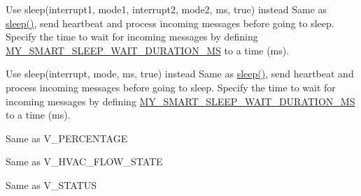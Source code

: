 \begin{DoxyRefList}
\item[Member \mbox{\hyperlink{group___my_sensors_coregrp_ga4cdf6cad964561b3ab0d6058d1a4d0b5}{smart\+Sleep}} (const uint8\+\_\+t interrupt1, const uint8\+\_\+t mode1, const uint8\+\_\+t interrupt2, const uint8\+\_\+t mode2, const uint32\+\_\+t sleeping\+MS=0)]\label{deprecated__deprecated000022}%
%
Use sleep(interrupt1, mode1, interrupt2, mode2, ms, true) instead Same as \mbox{\hyperlink{group___my_sensors_coregrp_gab5f84c4227e3478af4b6600d5e8d8b15}{sleep()}}, send heartbeat and process incoming messages before going to sleep. Specify the time to wait for incoming messages by defining \mbox{\hyperlink{group___sleep_setting_grp_pub_gaf353bf3627ebd8f15e200b320e2e065d}{M\+Y\+\_\+\+S\+M\+A\+R\+T\+\_\+\+S\+L\+E\+E\+P\+\_\+\+W\+A\+I\+T\+\_\+\+D\+U\+R\+A\+T\+I\+O\+N\+\_\+\+MS}} to a time (ms).  
\item[Member \mbox{\hyperlink{group___my_sensors_coregrp_gad9e11c9a491940337f7354f553391f2f}{smart\+Sleep}} (const uint8\+\_\+t interrupt, const uint8\+\_\+t mode, const uint32\+\_\+t sleeping\+MS=0)]\label{deprecated__deprecated000021}%
%
Use sleep(interrupt, mode, ms, true) instead Same as \mbox{\hyperlink{group___my_sensors_coregrp_gab5f84c4227e3478af4b6600d5e8d8b15}{sleep()}}, send heartbeat and process incoming messages before going to sleep. Specify the time to wait for incoming messages by defining \mbox{\hyperlink{group___sleep_setting_grp_pub_gaf353bf3627ebd8f15e200b320e2e065d}{M\+Y\+\_\+\+S\+M\+A\+R\+T\+\_\+\+S\+L\+E\+E\+P\+\_\+\+W\+A\+I\+T\+\_\+\+D\+U\+R\+A\+T\+I\+O\+N\+\_\+\+MS}} to a time (ms).  
\item[Member \mbox{\hyperlink{group___my_messagegrp_gga8e8ca11f004253ffb7a11f52db39bea2a28ecbff1ba5590fc86d36993e62ae04e}{V\+\_\+\+D\+I\+M\+M\+ER}} ]\label{deprecated__deprecated000018}%
%
Same as V\+\_\+\+P\+E\+R\+C\+E\+N\+T\+A\+GE  
\item[Member \mbox{\hyperlink{group___my_messagegrp_gga8e8ca11f004253ffb7a11f52db39bea2a2338665cfc74ba91f4c9b35959679280}{V\+\_\+\+H\+E\+A\+T\+ER}} ]\label{deprecated__deprecated000019}%
%
Same as V\+\_\+\+H\+V\+A\+C\+\_\+\+F\+L\+O\+W\+\_\+\+S\+T\+A\+TE  
\item[Member \mbox{\hyperlink{group___my_messagegrp_gga8e8ca11f004253ffb7a11f52db39bea2a86ac9dae03e7b3dde770d4024bd1a94c}{V\+\_\+\+L\+I\+G\+HT}} ]\label{deprecated__deprecated000017}%
%
Same as V\+\_\+\+S\+T\+A\+T\+US 
\end{DoxyRefList}